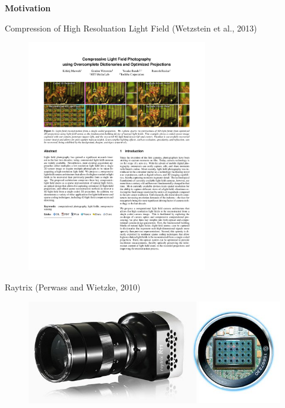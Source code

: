 \begin{frame}{}

\begin{center}
\textbf{\huge{Motivation}}
\end{center}

\end{frame}


\begin{frame}{Compression of High Resoluation Light Field (Wetzstein et al., 2013)}
\begin{figure}[h!]
\centering
\includegraphics[width=0.7\textwidth]{./images/compressed_light_field.pdf}
\label{fig:C2S0F3}
\end{figure}
\end{frame}

\begin{frame}{Raytrix (Perwass and Wietzke, 2010)}
\begin{figure}[h!]
\centering
\includegraphics[width=1\textwidth]{../../Diagrams/raytrix.jpg}
\label{fig:C2S0F3}
\end{figure}
\end{frame}

